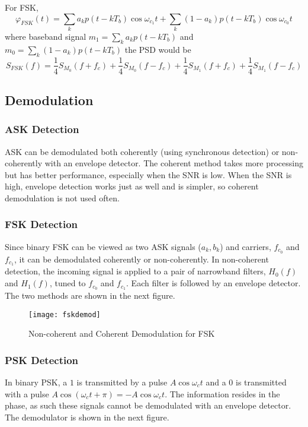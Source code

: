 \documentclass{article}
\begin{document}
    For FSK,
    \begin{equation}
        \varphi_{FSK}(t) = \sum_k a_kp(t-kT_b)\cos\omega_{c_1}t + \sum_k(1-a_k)p(t-kT_b)\cos\omega_{c_0}t
    \end{equation}
    where baseband signal $m_1 = \sum_k a_kp(t-kT_b)$ and $m_0 = \sum_k (1-a_k)p(t-kT_b)$ the PSD would be
    \begin{equation}
        S_{FSK}(f) = \frac{1}{4}S_{M_0}(f+f_c) + \frac{1}{4}S_{M_0}(f-f_c)
            + \frac{1}{4}S_{M_1}(f+f_c) + \frac{1}{4}S_{M_1}(f-f_c)
    \end{equation}

    \subsection{Demodulation}
    \subsubsection{ASK Detection}
    ASK can be demodulated both coherently (using synchronous detection) or non-coherently with an envelope 
    detector. The coherent method takes more processing but has better performance, especially when the 
    SNR is low. When the SNR is high, envelope detection works just as well and is simpler, so coherent
    demodulation is not used often. 
    \subsubsection{FSK Detection}
    Since binary FSK can be viewed as two ASK signals ($a_k, b_k$) and carriers, $f_{c_0}$ and $f_{c_1}$, it
    can be demodulated coherently or non-coherently. In non-coherent detection, the incoming signal is
    applied to a pair of narrowband filters, $H_0(f)$ and $H_1(f)$, tuned to $f_{c_0}$ and $f_{c_1}$. Each 
    filter is followed by an envelope detector. The two methods are shown in the next figure. 
    
    \begin{figure}[h]
        \centering
        \texttt{[image: fskdemod]}
        \caption{Non-coherent and Coherent Demodulation for FSK}
    \end{figure}

    \subsubsection{PSK Detection}
    In binary PSK, a $1$ is transmitted by a pulse $A\cos \omega_ct$ and a $0$ is transmitted with a 
    pulse $A\cos(\omega_ct + \pi) = -A\cos\omega_ct$. The information resides in the phase, as such these
    signals cannot be demodulated with an envelope detector. The demodulator is shown in the next
    figure. 
\end{document}
